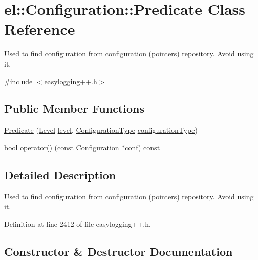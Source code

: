 \hypertarget{classel_1_1_configuration_1_1_predicate}{}\section{el\+:\+:Configuration\+:\+:Predicate Class Reference}
\label{classel_1_1_configuration_1_1_predicate}


Used to find configuration from configuration (pointers) repository. Avoid using it.  




{\ttfamily \#include $<$easylogging++.\+h$>$}

\subsection*{Public Member Functions}
\begin{DoxyCompactItemize}
\item 
\hyperlink{classel_1_1_configuration_1_1_predicate_ab0a4580d6c2d1aaf36a62913fdc38447}{Predicate} (\hyperlink{namespaceel_ab0ac6091262344c52dd2d3ad099e8e36}{Level} \hyperlink{classel_1_1_configuration_a66a96cf46d20204c50718f8a5e3622e2}{level}, \hyperlink{namespaceel_a281f5db6d6163678bc68a8b23b59e124}{Configuration\+Type} \hyperlink{classel_1_1_configuration_aab5091dcca176e309c0a2268ff55db0d}{configuration\+Type})
\item 
bool \hyperlink{classel_1_1_configuration_1_1_predicate_a985dce44ae06854e789a2ad3be11698f}{operator()} (const \hyperlink{classel_1_1_configuration}{Configuration} $\ast$conf) const 
\end{DoxyCompactItemize}


\subsection{Detailed Description}
Used to find configuration from configuration (pointers) repository. Avoid using it. 

Definition at line 2412 of file easylogging++.\+h.



\subsection{Constructor \& Destructor Documentation}
\hypertarget{classel_1_1_configuration_1_1_predicate_ab0a4580d6c2d1aaf36a62913fdc38447}{}
